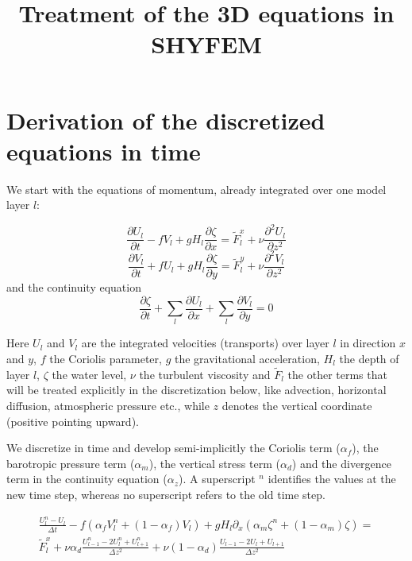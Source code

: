 \documentclass[12pt,draft]{article}
\title{Treatment of the 3D equations in SHYFEM}
\newcommand{\Unod}{U}
\newcommand{\Vnod}{V}
\newcommand{\znod}{\zeta}
\newcommand{\Unew}{U^n}
\newcommand{\Vnew}{V^n}
\newcommand{\znew}{\zeta^n}
\newcommand{\Uold}{U}
\newcommand{\Vold}{V}
\newcommand{\zold}{\zeta}
\newcommand{\dt}{\Delta t}
\newcommand{\dz}{\Delta z}
\newcommand{\Ftilde}{\tilde{F}}
\newcommand{\Ftx}[1]{\tilde{F}^x_{#1}}
\newcommand{\Fty}[1]{\tilde{F}^y_{#1}}
\newcommand{\delx}{\partial_x}
\newcommand{\dpartt}[1]{\frac{\partial #1}{\partial t}}
\newcommand{\dpartx}[1]{\frac{\partial #1}{\partial x}}
\newcommand{\dparty}[1]{\frac{\partial #1}{\partial y}}
\newcommand{\dpartzz}[1]{\frac{\partial^2 #1}{\partial z^2}}
\begin{document}
\maketitle

\section{Derivation of the discretized equations in time}

We start with the equations of momentum, already integrated over one model layer $l$:

\begin{equation}
	\dpartt{\Unod_l} - f\Vnod_l + gH_l\dpartx{\znod}
		= \Ftx{l} + \nu\dpartzz{\Unod_l}
\end{equation}
\begin{equation}
	\dpartt{\Vnod_l} + f\Unod_l + gH_l\dparty{\znod}
		= \Fty{l} + \nu\dpartzz{\Vnod_l}
\end{equation}
and the continuity equation
\begin{equation}
	\dpartt{\znod}
		+ \sum_l \dpartx{\Unod_l}
		+ \sum_l \dparty{\Vnod_l}
		= 0
\end{equation}


Here $\Unod_l$ and $\Vnod_l$ are the integrated velocities (transports) over layer
$l$ in direction $x$ and $y$,
$f$ the Coriolis parameter, $g$ the gravitational acceleration, $H_l$ the depth of
layer $l$, $\znod$ the water level,
$\nu$ the turbulent viscosity and $\Ftilde_l$ the other terms that will be
treated explicitly in the discretization below, like advection, horizontal diffusion,
atmospheric pressure etc., while $z$ denotes the vertical 
coordinate (positive pointing upward).

We discretize in time and develop semi-implicitly the Coriolis term ($\alpha_f$),
the barotropic pressure term ($\alpha_m$), the vertical stress term ($\alpha_d$)
and the divergence term in the continuity equation ($\alpha_z$).
A superscript ${}^n$ identifies the values at the new time step, 
whereas no superscript refers to the
old time step.

\begin{multline}
	\frac{\Unew_l-\Uold_l}{\dt} 
	- f(\alpha_f\Vnew_l + (1-\alpha_f)\Vold_l) 
	+ gH_l \delx(\alpha_m\znew + (1-\alpha_m)\zold) 
	= \\
	\Ftx{l} 
	+ \nu\alpha_d\frac{\Unew_{l-1}-2\Unew_l+\Unew_{l+1}}{\dz^2}
	+ \nu(1-\alpha_d)\frac{\Uold_{l-1}-2\Uold_l+\Uold_{l+1}}{\dz^2}
\end{multline}
\end{document}
